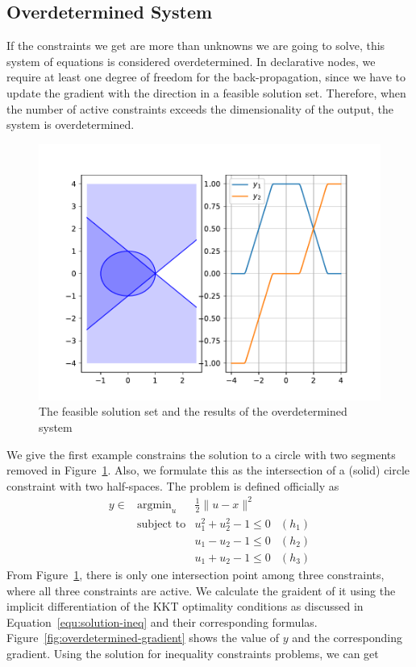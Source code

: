 \subsection{Overdetermined System}
If the constraints we get are more than unknowns we are going to solve, this system of equations is considered overdetermined. In declarative nodes, we require at least one degree of freedom for the back-propagation, since we have to update the gradient with the direction in a feasible solution set. Therefore, when the number of active constraints exceeds the dimensionality of the output, the system is overdetermined. 
\begin{figure}[t]
    \label{fig:overdetermined-solution}
    \centering
    \includegraphics[page=1, width=.8\textwidth]{figs/overdetermined.pdf}
    \caption{The feasible solution set and the results of the overdetermined system}
\end{figure}
\par We give the first example constrains the solution to a circle with two segments removed in Figure~\ref{fig:overdetermined-solution}. Also, we formulate this as the intersection of a (solid) circle constraint with two half-spaces. The problem is defined officially as 
\begin{equation}
    \begin{array}{llll}
        y \in & \text{argmin}_u & \frac{1}{2} \|u - x\|^2 \\
        & \text{subject to} & u_1^2 + u_2^2 - 1 \leq 0 & (h_1) \\
        & & u_1 - u_2 - 1 \leq 0 & (h_2) \\
        & & u_1 + u_2 - 1 \leq 0 & (h_3)
    \end{array}
\end{equation}
From Figure~\ref{fig:overdetermined-solution}, there is only one intersection point among three constraints, where all three constraints are active. We calculate the graident of it using the implicit differentiation of the KKT optimality conditions as discussed in Equation~\ref{equ:solution-ineq} and their corresponding formulas. Figure~\ref{fig:overdetermined-gradient} shows the value of $y$ and the corresponding gradient. Using the solution for inequality constraints problems, we can get
